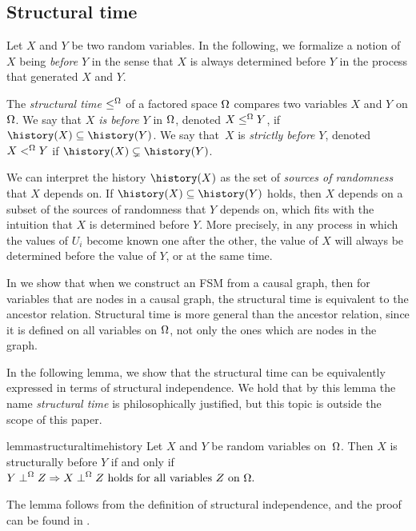 \documentclass[USenglish,onecolumn]{article}
\begin{document}
\subsection{Structural time}
Let $X$ and $Y$ be two random variables. In the following, we formalize a notion of $X$ being \emph{before} $Y$ in the sense that $X$ is always determined before $Y$ in the process that generated $X$ and $Y$.
\begin{definition}\label{def:structuraltime}
The \emph{structural time} $\leq^\Omega$ of a factored space $\Omega$ compares two variables $X$ and $Y$ on $\Omega$. We say that \emph{$X$ is before $Y$} in $\Omega$, denoted $X\leq^\Omega Y$, if $\history(X)\subseteq \history(Y)$.
We say that~$X$ is \emph{strictly before} $Y$, denoted $X<^\Omega Y$ if $\history(X)\subsetneq\history(Y)$.
\end{definition}
We can interpret the history $\history(X)$ as the set of \emph{sources of randomness} that $X$ depends on. If $\history(X)\subseteq\history(Y)$ holds, then $X$ depends on a subset of the sources of randomness that $Y$ depends on, which fits with the intuition that $X$ is determined before $Y$. More precisely, in any process in which the values of $U_i$ become known one after the other, the value of $X$ will always be determined before the value of $Y$, or at the same time.

In  we show that when we construct an FSM from a causal graph, then for variables that are nodes in a causal graph, the structural time is equivalent to the ancestor relation. Structural time is more general than the ancestor relation, since it is defined on all variables on $\Omega$, not only the ones which are nodes in the graph.

In the following lemma, we show that the structural time can be equivalently expressed in terms of structural independence.
We hold that by this lemma the name \emph{structural time} is philosophically justified, but this topic is outside the scope of this paper.

\begin{restatable}{lemma}{structuraltimehistory}
\label{lemma:structuraltimehistory}
Let $X$ and $Y$ be random variables on~$\Omega$. Then $X$ is structurally before $Y$ if and only if
%
\(Y \mathrel{\perp}^\Omega Z \Rightarrow X\mathrel{\perp}^\Omega Z \textnormal{ holds for all variables }Z\textnormal{ on }\Omega.\)
%
\end{restatable}
\noindent
The lemma follows from the definition of structural independence, and the proof can be found in .
\end{document}
